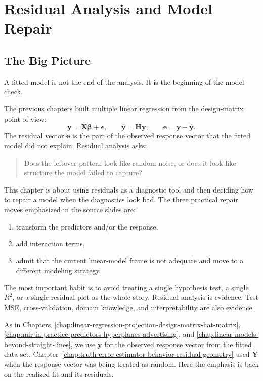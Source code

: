 \chapter[Residual Analysis and Model Repair]{Residual Analysis and Model Repair}
\label{chap:residual-analysis-model-repair}

\section{The Big Picture}

A fitted model is not the end of the analysis.  It is the beginning of the model check.

The previous chapters built multiple linear regression from the design-matrix point of view:
\begin{equation}
  \mathbf{y}=\mathbf{X}\boldsymbol{\beta}+\boldsymbol{\epsilon},
  \qquad
  \widehat{\mathbf{y}}=\mathbf{H}\mathbf{y},
  \qquad
  \mathbf{e}=\mathbf{y}-\widehat{\mathbf{y}}.
\end{equation}
The residual vector \(\mathbf{e}\) is the part of the observed response vector that the fitted model did not explain.  Residual analysis asks:
\begin{quote}
  Does the leftover pattern look like random noise, or does it look like structure the model failed to capture?
\end{quote}

This chapter is about using residuals as a diagnostic tool and then deciding how to repair a model when the diagnostics look bad.  The three practical repair moves emphasized in the source slides are:
\begin{enumerate}
  \item transform the predictors and/or the response,
  \item add interaction terms,
  \item admit that the current linear-model frame is not adequate and move to a different modeling strategy.
\end{enumerate}

The most important habit is to avoid treating a single hypothesis test, a single \(R^2\), or a single residual plot as the whole story.  Residual analysis is evidence.  Test MSE, cross-validation, domain knowledge, and interpretability are also evidence.

As in Chapters~\ref{chap:linear-regression-projection-design-matrix-hat-matrix}, \ref{chap:mlr-in-practice-predictors-hyperplanes-advertising}, and \ref{chap:linear-models-beyond-straight-lines}, we use \(\mathbf{y}\) for the observed response vector from the fitted data set.  Chapter~\ref{chap:truth-error-estimator-behavior-residual-geometry} used \(\mathbf{Y}\) when the response vector was being treated as random.  Here the emphasis is back on the realized fit and its residuals.

